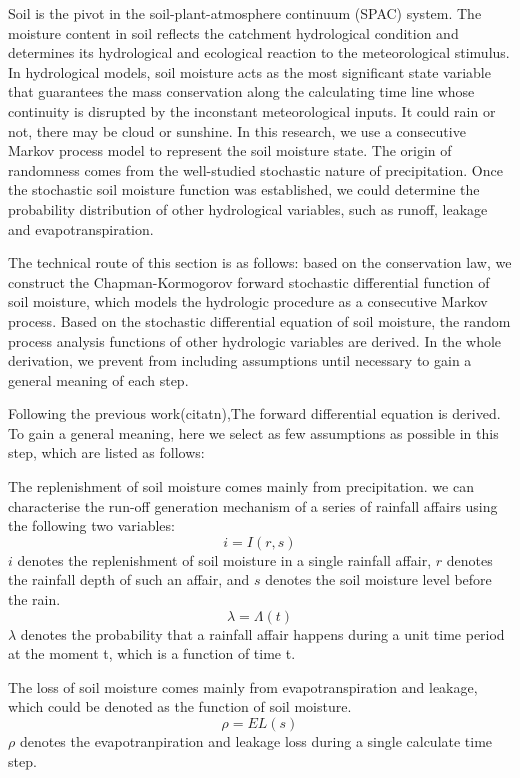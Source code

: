 Soil is the pivot in the soil-plant-atmosphere continuum (SPAC) system. The moisture content in soil reflects the catchment hydrological condition and determines its hydrological and ecological reaction to the meteorological stimulus. In hydrological models, soil moisture acts as the most significant state variable that guarantees the mass conservation along the calculating time line whose continuity is disrupted by the inconstant meteorological inputs. It could rain or not, there may be cloud or sunshine. In this research, we use a consecutive Markov process model to represent the soil moisture state. The origin of randomness comes from the well-studied stochastic nature of precipitation. Once the stochastic soil moisture function was established, we could determine the probability distribution of other hydrological variables, such as runoff, leakage and evapotranspiration.

The technical route of this section is as follows: based on the conservation law, we construct the Chapman-Kormogorov forward stochastic differential function of soil moisture, which models the hydrologic procedure as a consecutive Markov process.  Based on the stochastic differential equation of soil moisture, the random process analysis functions of other hydrologic variables are derived. In the whole derivation, we prevent from  including assumptions until necessary to gain a general meaning of each step.


Following the previous work(citatn),The forward differential equation is derived. To gain a general meaning, here we select as few assumptions as possible in this step, which are listed as follows:

The replenishment of soil moisture comes mainly from  precipitation. we can characterise the run-off generation mechanism of a series of rainfall affairs using the following two variables:
\begin{equation}
i=I(r,s)
\end{equation}
$i$ denotes the replenishment of soil moisture in a single rainfall affair, $r$ denotes the rainfall depth of such an affair, and $s$ denotes the soil moisture level before the rain.
\begin{equation}
\lambda=\Lambda(t)
\end{equation}
$\lambda$ denotes the probability that a rainfall affair happens during a unit time period at the moment t, which is a function of time t.

The loss of soil moisture comes mainly from evapotranspiration and leakage, which could be denoted as the function of soil moisture.
\begin{equation}
\rho=EL(s)
\end{equation}
$\rho$ denotes the evapotranpiration and leakage loss during a single calculate time step.
